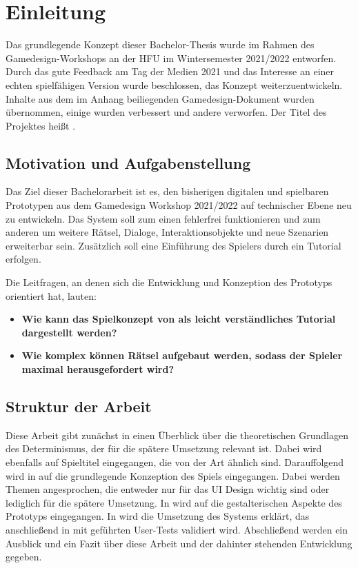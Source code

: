 \chapter{Einleitung}\label{sec:intro}
Das grundlegende Konzept dieser Bachelor-Thesis wurde im Rahmen des Gamedesign-Workshops an der \ac{HFU} im Wintersemester 2021/2022 entworfen.
Durch das gute Feedback am Tag der Medien 2021 und das Interesse an einer echten spielfähigen Version wurde beschlossen, das Konzept weiterzuentwickeln. 
Inhalte aus dem im Anhang beiliegenden Gamedesign-Dokument wurden übernommen, einige wurden verbessert und andere verworfen. 
Der Titel des Projektes heißt .


\section{Motivation und Aufgabenstellung}
Das Ziel dieser Bachelorarbeit ist es, den bisherigen digitalen und spielbaren Prototypen aus dem Gamedesign Workshop 2021/2022 auf technischer Ebene neu zu entwickeln. Das System soll zum einen fehlerfrei funktionieren und zum anderen um weitere Rätsel, Dialoge, Interaktionsobjekte und neue Szenarien erweiterbar sein. Zusätzlich soll eine Einführung des Spielers durch ein Tutorial erfolgen. 


Die Leitfragen, an denen sich die Entwicklung und Konzeption des Prototyps orientiert hat, lauten:
\begin{itemize}  
    \item \textbf{Wie kann das Spielkonzept von  \emph{} als leicht verständliches Tutorial dargestellt werden?}
    \item \textbf{Wie komplex können Rätsel aufgebaut werden, sodass der Spieler maximal herausgefordert wird?}
\end{itemize}

\section{Struktur der Arbeit}
Diese Arbeit gibt zunächst in  einen Überblick über die theoretischen Grundlagen des Determinismus, der für die spätere Umsetzung relevant ist. Dabei wird ebenfalls auf Spieltitel eingegangen, die von der Art ähnlich sind. Darauffolgend wird in  auf die grundlegende Konzeption des Spiels eingegangen. Dabei werden Themen angesprochen, die entweder nur für das \ac{UI} Design wichtig sind oder lediglich für die spätere Umsetzung. In  wird auf die gestalterischen Aspekte des Prototyps eingegangen. In  wird die Umsetzung des Systems erklärt, das anschließend in  mit geführten User-Tests validiert wird. Abschließend werden ein Ausblick und ein Fazit über diese Arbeit und der dahinter stehenden Entwicklung gegeben.
